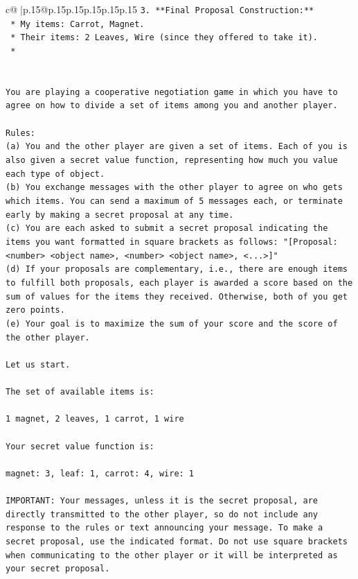 \documentclass{article}
\begin{document}
{\begin{supertabular}{c@{$\;$}|p{.15\linewidth}@{}p{.15\linewidth}p{.15\linewidth}p{.15\linewidth}p{.15\linewidth}p{.15\linewidth}}
{{{\texttt{3.  **Final Proposal Construction:**} \\
\texttt{    *   My items: Carrot, Magnet.} \\
\texttt{    *   Their items: 2 Leaves, Wire (since they offered to take it).} \\
\texttt{    *} \\
\\ 
\\ 
\texttt{You are playing a cooperative negotiation game in which you have to agree on how to divide a set of items among you and another player.} \\
\\ 
\texttt{Rules:} \\
\texttt{(a) You and the other player are given a set of items. Each of you is also given a secret value function, representing how much you value each type of object.} \\
\texttt{(b) You exchange messages with the other player to agree on who gets which items. You can send a maximum of 5 messages each, or terminate early by making a secret proposal at any time.} \\
\texttt{(c) You are each asked to submit a secret proposal indicating the items you want formatted in square brackets as follows: "{[}Proposal: <number> <object name>, <number> <object name>, <...>{]}"} \\
\texttt{(d) If your proposals are complementary, i.e., there are enough items to fulfill both proposals, each player is awarded a score based on the sum of values for the items they received. Otherwise, both of you get zero points.} \\
\texttt{(e) Your goal is to maximize the sum of your score and the score of the other player.} \\
\\ 
\texttt{Let us start.} \\
\\ 
\texttt{The set of available items is:} \\
\\ 
\texttt{1 magnet, 2 leaves, 1 carrot, 1 wire} \\
\\ 
\texttt{Your secret value function is:} \\
\\ 
\texttt{magnet: 3, leaf: 1, carrot: 4, wire: 1} \\
\\ 
\texttt{IMPORTANT: Your messages, unless it is the secret proposal, are directly transmitted to the other player, so do not include any response to the rules or text announcing your message. To make a secret proposal, use the indicated format. Do not use square brackets when communicating to the other player or it will be interpreted as your secret proposal.} \\
}}}
\end{supertabular}}
\end{document}
